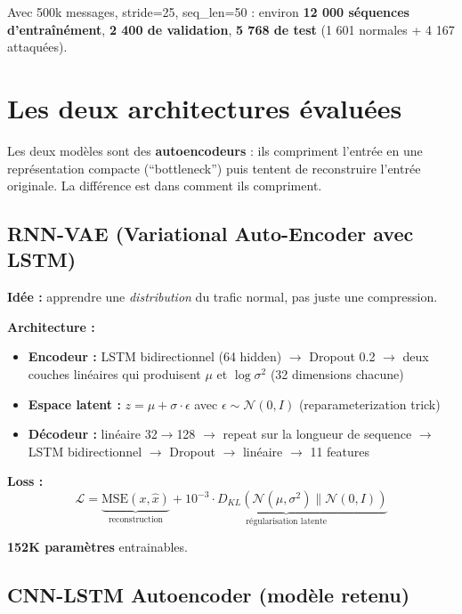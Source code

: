 \documentclass[12pt,a4paper]{article}
\begin{document}
Avec 500k messages, stride=25, seq\_len=50 : environ \textbf{12 000 séquences d'entraînément}, \textbf{2 400 de validation}, \textbf{5 768 de test} (1 601 normales + 4 167 attaquées).

\section{Les deux architectures évaluées}

Les deux modèles sont des \textbf{autoencodeurs} : ils compriment l'entrée en une représentation compacte (``bottleneck'') puis tentent de reconstruire l'entrée originale. La différence est dans comment ils compriment.

\subsection{RNN-VAE (Variational Auto-Encoder avec LSTM)}

\textbf{Idée :} apprendre une \textit{distribution} du trafic normal, pas juste une compression.

\textbf{Architecture :}
\begin{itemize}[noitemsep]
    \item \textbf{Encodeur :} LSTM bidirectionnel (64 hidden) $\to$ Dropout 0.2 $\to$ deux couches linéaires qui produisent $\mu$ et $\log\sigma^2$ (32 dimensions chacune)
    \item \textbf{Espace latent :} $z = \mu + \sigma \cdot \epsilon$ avec $\epsilon \sim \mathcal{N}(0, I)$ (reparameterization trick)
    \item \textbf{Décodeur :} linéaire 32$\to$128 $\to$ repeat sur la longueur de sequence $\to$ LSTM bidirectionnel $\to$ Dropout $\to$ linéaire $\to$ 11 features
\end{itemize}

\textbf{Loss :}
\begin{equation}
    \mathcal{L} = \underbrace{\text{MSE}(x, \hat{x})}_{\text{reconstruction}} + \underbrace{10^{-3} \cdot D_{KL}(\mathcal{N}(\mu, \sigma^2) \| \mathcal{N}(0, I))}_{\text{régularisation latente}}
\end{equation}

\textbf{152K paramètres} entrainables.

\subsection{CNN-LSTM Autoencoder (modèle retenu)}
\end{document}
